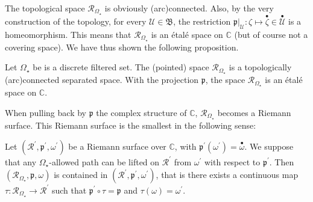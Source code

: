 \documentclass[11pt, english]{smfart}
\theoremstyle{definition}
\begin{document}
The topological space $\mathscr{R}_{\Omega_\star}$ is obviously 
(arc)connected. Also, by the very construction of the topology, for
every $\mathscr{U} \in \mathfrak{B}$, the restriction
$\mathfrak{p}|_{\mathscr{U}} : \zeta  \mapsto { {\stackrel{\bullet}{\zeta}} } \in
\stackrel{\bullet}{\mathscr{U}}$ is a 
homeomorphism. This means that $\mathscr{R}_{\Omega_\star}$ is an
\'etal\'e space on 
$\mathbb{C}$ (but of course not a covering space). 
We have thus shown the following proposition.

\begin{prop}\label{PFS-RS}
Let $\Omega_\star$ be is a discrete filtered set.
The (pointed) space  $\mathscr{R}_{\Omega_\star}$ is a topologically
(arc)connected separated space.  With the projection $\mathfrak{p}$, 
 the space  $\mathscr{R}_{\Omega_\star}$ is an \'etal\'e space on
$\mathbb{C}$.
\end{prop}

When pulling back by $\mathfrak{p}$ the complex structure of $\mathbb{C}$,
$\mathscr{R}_{\Omega_\star}$ becomes a Riemann surface. This Riemann
surface is the smallest in the following sense:

\begin{lemm}
Let $(\mathscr{R}^\prime,
\mathfrak{p}^\prime, \omega^\prime)$ be a Riemann surface over
$\mathbb{C}$, with $\mathfrak{p}^\prime(\omega^\prime)= { {\stackrel{\bullet}{\omega}} }$. We
suppose that any $\Omega_\star$-allowed path can be lifted on
$\mathscr{R}^\prime$ from
$\omega^\prime$ with respect to $\mathfrak{p}^\prime$. Then
$(\mathscr{R}_{\Omega_\star},\mathfrak{p}, \omega)$ is contained in $(\mathscr{R}^\prime,
\mathfrak{p}^\prime, \omega^\prime)$, that is there exists a continuous map
$\tau: \mathscr{R}_{\Omega_\star} \to \mathscr{R}^\prime$ such that
$\mathfrak{p}^\prime \circ \tau = \mathfrak{p}$ and $\tau(\omega)=\omega^\prime$.
\end{lemm}
\end{document}

